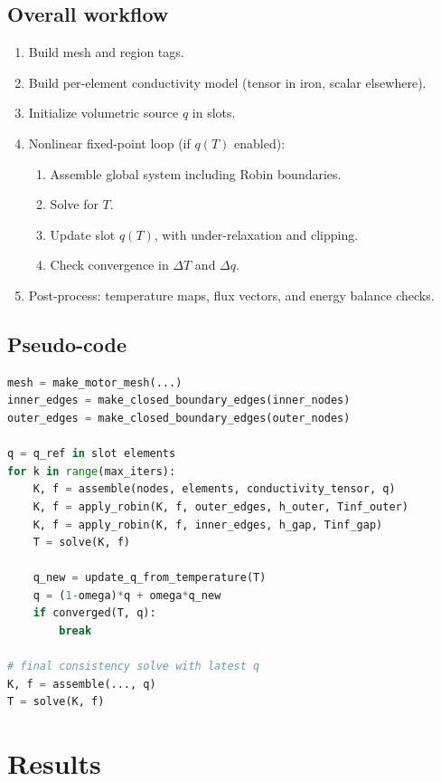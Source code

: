\documentclass[11pt,a4paper]{article}
\begin{document}
\subsection{Overall workflow}
\begin{enumerate}
    \item Build mesh and region tags.
    \item Build per-element conductivity model (tensor in iron, scalar elsewhere).
    \item Initialize volumetric source \(q\) in slots.
    \item Nonlinear fixed-point loop (if \(q(T)\) enabled):
    \begin{enumerate}
        \item Assemble global system including Robin boundaries.
        \item Solve for \(T\).
        \item Update slot \(q(T)\), with under-relaxation and clipping.
        \item Check convergence in \(\Delta T\) and \(\Delta q\).
    \end{enumerate}
    \item Post-process: temperature maps, flux vectors, and energy balance checks.
\end{enumerate}

\subsection{Pseudo-code}
\begin{lstlisting}[language=Python,caption={Simplified Phase 2 solver logic}]
mesh = make_motor_mesh(...)
inner_edges = make_closed_boundary_edges(inner_nodes)
outer_edges = make_closed_boundary_edges(outer_nodes)

q = q_ref in slot elements
for k in range(max_iters):
    K, f = assemble(nodes, elements, conductivity_tensor, q)
    K, f = apply_robin(K, f, outer_edges, h_outer, Tinf_outer)
    K, f = apply_robin(K, f, inner_edges, h_gap, Tinf_gap)
    T = solve(K, f)

    q_new = update_q_from_temperature(T)
    q = (1-omega)*q + omega*q_new
    if converged(T, q):
        break

# final consistency solve with latest q
K, f = assemble(..., q)
T = solve(K, f)
\end{lstlisting}

\clearpage
\section{Results}
\end{document}
